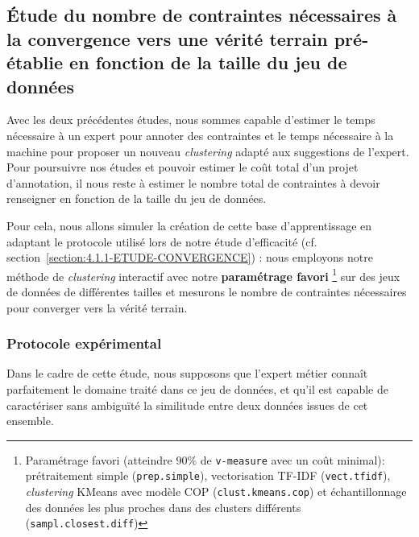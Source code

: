 	\subsection{Étude du nombre de contraintes nécessaires à la convergence vers une vérité terrain pré-établie en fonction de la taille du jeu de données}
	\label{section:4.3.3-ETUDE-COUT-NOMBRE-CONTRAINTES}
			
		Avec les deux précédentes études, nous sommes capable d'estimer le temps nécessaire à un expert pour annoter des contraintes et le temps nécessaire à la machine pour proposer un nouveau \textit{clustering} adapté aux suggestions de l'expert.
		Pour poursuivre nos études et pouvoir estimer le coût total d'un projet d'annotation, il nous reste à estimer le nombre total de contraintes à devoir renseigner en fonction de la taille du jeu de données.
		
		Pour cela, nous allons simuler la création de cette base d'apprentissage en adaptant le protocole utilisé lors de notre étude d'efficacité (cf. section~\ref{section:4.1.1-ETUDE-CONVERGENCE}) :
		nous employons notre méthode de \textit{clustering} interactif avec notre \textbf{paramétrage favori}
		\footnote{Paramétrage favori (atteindre $90$\% de \texttt{v-measure} avec un coût minimal): prétraitement simple (\texttt{prep.simple}), vectorisation TF-IDF (\texttt{vect.tfidf}), \textit{clustering} KMeans avec modèle COP (\texttt{clust.kmeans.cop}) et échantillonnage des données les plus proches dans des clusters différents (\texttt{sampl.closest.diff})}
		sur des jeux de données de différentes tailles et mesurons le nombre de contraintes nécessaires pour converger vers la vérité terrain.
	
		\subsubsection{Protocole expérimental}
			
			\begin{leftBarWarning}
				Dans le cadre de cette étude, nous supposons que l'expert métier connaît parfaitement le domaine traité dans ce jeu de données, et qu'il est capable de caractériser sans ambiguïté la similitude entre deux données issues de cet ensemble.
			\end{leftBarWarning}
			
